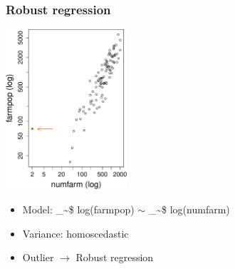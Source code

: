 \documentclass[framenumber,t]{beamer}
\makeatletter
\newcommand\code{\bgroup\@makeother\_\@makeother\~\@makeother\$\@makeother\^\@codex}
\def\@codex#1{{\normalfont\ttfamily\hyphenchar\font=-1 #1}\egroup}
\makeatother
\begin{document}
\begin{frame}[fragile]
    \frametitle{Robust regression}
    \begin{multicols}{2}
        \includegraphics[width=4.5cm]{figure/scatter_counties_log}
        \columnbreak
        \begin{itemize}
            \setlength\itemsep{1em}
            \item \alert{Model:} \code{log(farmpop)} $\sim$ \code{log(numfarm)}
            \item \alert{Variance:} homoscedastic
            \item \alert{Outlier} $\rightarrow$ Robust regression
        \end{itemize}
    \end{multicols}
\end{frame}
\end{document}
